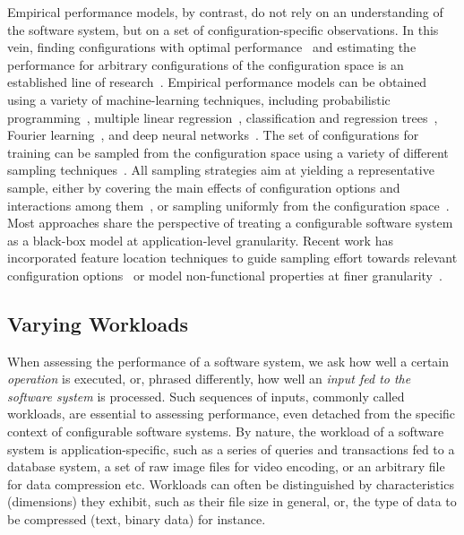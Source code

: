 Empirical performance models, by contrast, do not rely on an understanding of the software system, but on a set of configuration-specific observations. In this vein, finding configurations with optimal performance~\cite{nairUsingBadLearners2017,nairFlash18,ohFindingNearoptimalConfigurations2017} and estimating the performance for arbitrary configurations of the configuration space is an established line of research~\cite{siegmundPerformanceinfluenceModelsHighly2015,haDeepPerf2019,perfAL,guoVariabilityawarePerformancePrediction2013,sarkarCostEfficientSamplingPerformance,guo_2018_data,fourier_learning_2015,perLasso}.
Empirical performance models can be obtained using a variety of machine-learning techniques, including probabilistic programming~\cite{dorn2020}, multiple linear regression~\cite{siegmundPerformanceinfluenceModelsHighly2015}, classification and regression trees~\cite{sarkarCostEfficientSamplingPerformance,guo_2018_data}, Fourier learning~\cite{fourier_learning_2015,perLasso}, and deep neural networks~\cite{haDeepPerf2019,perfAL}.
The set of configurations for training can be sampled from the configuration space using a variety of different sampling techniques~\cite{kaltenecker_interplay_2020}. All sampling strategies aim at yielding a representative sample, either by covering the main effects of configuration options and interactions among them~\cite{siegmundPredictingPerformanceAutomated2012}, or sampling uniformly from the configuration space~\cite{ohFindingNearoptimalConfigurations2017,kaltenecker_distance-based_2019}.
Most approaches share the perspective of treating a configurable software system as a black-box model at application-level granularity. Recent work has incorporated feature location techniques to guide sampling effort towards relevant configuration options~\cite{velez_2020_configcrusher_jase,velez_comprex_2021} or model non-functional properties at finer granularity~\cite{weber_white_2021}.

\subsection{Varying Workloads}
When assessing the performance of a software system, we ask how well a certain \textit{operation} is executed, or, phrased differently, how well an \textit{input fed to the software system} is processed. Such sequences of inputs, commonly called workloads, are essential to assessing performance, even detached from the specific context of configurable software systems. By nature, the workload of a software system is application-specific, such as a series of queries and transactions fed to a database system, a set of raw image files for video encoding, or an arbitrary file for data compression etc. Workloads can often be distinguished by characteristics (dimensions) they exhibit, such as their file size in general, or, the  type of data to be compressed (text, binary data) for instance.

